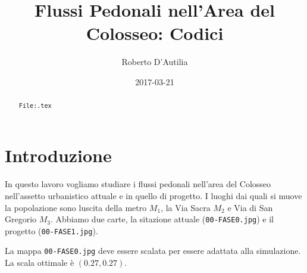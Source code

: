 \documentclass[]{article}
\title{Flussi Pedonali nell'Area del Colosseo: Codici}
\author{Roberto D'Autilia}
\date{2017-03-21}
\begin{document}
\lstset{
	language=C,                             %
	basicstyle=\ttfamily,                   %
	breaklines=true,
	columns=flexible,                       %
}

\ifpdf
{}
\else
{}
\fi

\maketitle


\begin{abstract}
{\tt File:\jobname.tex}\\
\end{abstract}

\section{Introduzione}
In questo lavoro vogliamo studiare i flussi pedonali nell'area del Colosseo nell'assetto urbanistico attuale e in quello di progetto.
I luoghi dai quali si muove la popolazione sono luscita della metro $M_1$, la Via Sacra $M_2$ e Via di San Gregorio $M_3$.
Abbiamo due carte, la sitazione attuale ({\tt 00-FASE0.jpg}) e il progetto ({\tt 00-FASE1.jpg}).

La mappa {\tt 00-FASE0.jpg} deve essere scalata per essere adattata alla simulazione.
La scala ottimale è $(0.27,0.27)$.
\end{document}
